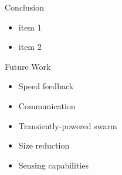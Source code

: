 \documentclass{beamer}
\begin{document}
\begin{frame}{Conclusion}
	\begin{itemize}
		\item item 1
		\item item 2
	\end{itemize}
\end{frame}

\begin{frame}{Future Work}
	\begin{itemize}
		\setlength\itemsep{1em}
		\item Speed feedback 
		\item Communication
		\item Transiently-powered swarm
		\item Size reduction
		\item Sensing capabilities
	\end{itemize}
\end{frame}
\end{document}
